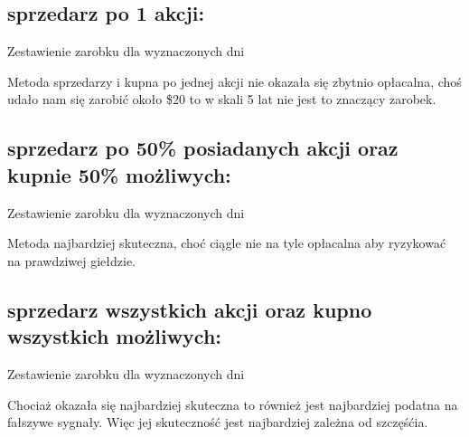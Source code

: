 \documentclass{article}
\begin{document}
    \subsection{sprzedarz po 1 akcji:}
    \begin{table}[ht]
        \centering
        
        \caption{Zestawienie zarobku dla wyznaczonych dni}
    \end{table}
    Metoda sprzedarzy i kupna po jednej akcji nie okazała się zbytnio opłacalna, choś udało nam się zarobić około \$20 to w skali 5 lat nie jest to znaczący zarobek.

    \subsection{sprzedarz po 50\% posiadanych akcji oraz kupnie 50\% możliwych:}
    \begin{table}[ht]
        \centering
        
        \caption{Zestawienie zarobku dla wyznaczonych dni}
    \end{table}
    Metoda najbardziej skuteczna, choć ciągle nie na tyle opłacalna aby ryzykować na prawdziwej giełdzie.
    

    \subsection{sprzedarz wszystkich akcji oraz kupno wszystkich możliwych:}
    \begin{table}[ht]
        \centering
        
        \caption{Zestawienie zarobku dla wyznaczonych dni}
    \end{table}
    Chociaż okazała się najbardziej skuteczna to również jest najbardziej podatna na fałszywe sygnały. Więc jej skuteczność jest najbardziej zależna od szczęśćia.
    
\end{document}
